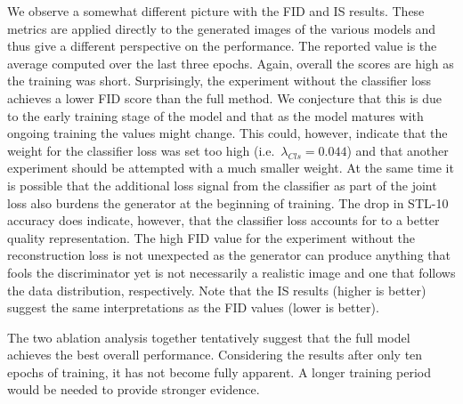 \documentclass[a4paper,12pt]{report}
\begin{document}
We observe a somewhat different picture with the FID and IS results. These metrics are applied directly to the generated images of the various models and thus give a different perspective on the performance. The reported value is the average computed over the last three epochs. Again, overall the scores are high as the training was short. Surprisingly, the experiment without the classifier loss achieves a lower FID score than the full method. We conjecture that this is due to the early training stage of the model and that as the model matures with ongoing training the values might change. This could, however, indicate that the weight for the classifier loss was set too high (i.e.\ $\lambda_{Cls} = 0.044$) and that another experiment should be attempted with a much smaller weight. At the same time it is possible that the additional loss signal from the classifier as part of the joint loss also burdens the generator at the beginning of training. The drop in STL-10 accuracy does indicate, however, that the classifier loss accounts for to a better quality representation. The high FID value for the experiment without the reconstruction loss is not unexpected as the generator can produce anything that fools the discriminator yet is not necessarily a realistic image and one that follows the data distribution, respectively. Note that the IS results (higher is better) suggest the same interpretations as the FID values (lower is better).

The two ablation analysis together tentatively suggest that the full model achieves the best overall performance. Considering the results after only ten epochs of training, it has not become fully apparent. A longer training period would be needed to provide stronger evidence.

% 
% 	
% 
\end{document}
